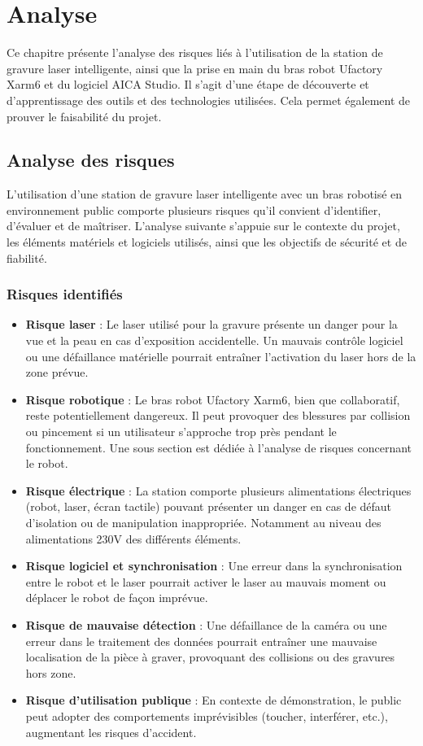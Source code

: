 \chapter{Analyse}
\label{chap:analyse}

Ce chapitre présente l'analyse des risques liés à l'utilisation de la station de gravure laser intelligente, ainsi que la prise en main du bras robot Ufactory Xarm6 et du logiciel AICA Studio. Il s'agit d'une étape de découverte et d'apprentissage des outils et des technologies utilisées. Cela permet également de prouver le faisabilité du projet.

\section{Analyse des risques}
L'utilisation d'une station de gravure laser intelligente avec un bras robotisé en environnement public comporte plusieurs risques qu'il convient d'identifier, d'évaluer et de maîtriser. L'analyse suivante s'appuie sur le contexte du projet, les éléments matériels et logiciels utilisés, ainsi que les objectifs de sécurité et de fiabilité.

\subsection{Risques identifiés}
\begin{itemize}
    \item \textbf{Risque laser} : Le laser utilisé pour la gravure présente un danger pour la vue et la peau en cas d'exposition accidentelle. Un mauvais contrôle logiciel ou une défaillance matérielle pourrait entraîner l'activation du laser hors de la zone prévue.
    \item \textbf{Risque robotique} : Le bras robot Ufactory Xarm6, bien que collaboratif, reste potentiellement dangereux. Il peut provoquer des blessures par collision ou pincement si un utilisateur s'approche trop près pendant le fonctionnement. Une sous section est dédiée à l'analyse de risques concernant le robot.
    \item \textbf{Risque électrique} : La station comporte plusieurs alimentations électriques (robot, laser, écran tactile) pouvant présenter un danger en cas de défaut d'isolation ou de manipulation inappropriée. Notamment au niveau des alimentations 230V des différents éléments.
    \item \textbf{Risque logiciel et synchronisation} : Une erreur dans la synchronisation entre le robot et le laser pourrait activer le laser au mauvais moment ou déplacer le robot de façon imprévue.
    \item \textbf{Risque de mauvaise détection} : Une défaillance de la caméra ou une erreur dans le traitement des données pourrait entraîner une mauvaise localisation de la pièce à graver, provoquant des collisions ou des gravures hors zone.
    \item \textbf{Risque d'utilisation publique} : En contexte de démonstration, le public peut adopter des comportements imprévisibles (toucher, interférer, etc.), augmentant les risques d'accident.
\end{itemize}

